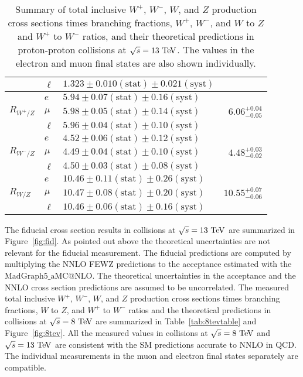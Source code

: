 \begin{table*}[tbhp]
\begin {tabular} {lllr}
  & $\ell$ & $1.323 \pm 0.010 \mathrm{(stat)}\pm 0.021 \mathrm{(syst)}$ & \\
\hline
             & $e$   & $5.94 \pm 0.07 \mathrm{(stat)}\pm 0.16 \mathrm{(syst)}$ &
             \\
$R_{W^{+}/Z}$   & $\mu$ & $5.98 \pm 0.05 \mathrm{(stat)}\pm 0.14 \mathrm{(syst)}$ & $6.06^{+0.04}_{-0.05}$ \\
             & $\ell$ & $5.96 \pm 0.04 \mathrm{(stat)}\pm 0.10 \mathrm{(syst)}$ &  \\
\hline
             & $e$   & $4.52 \pm 0.06 \mathrm{(stat)}\pm 0.12 \mathrm{(syst)}$ &
             \\
$R_{W^{-}/Z}$   & $\mu$ & $4.49 \pm 0.04 \mathrm{(stat)}\pm 0.10 \mathrm{(syst)}$ & $4.48^{+0.03}_{-0.02}$ \\
             & $\ell$ & $4.50 \pm 0.03 \mathrm{(stat)}\pm 0.08 \mathrm{(syst)}$ &  \\
\hline
             & $e$   & $10.46 \pm 0.11 \mathrm{(stat)}\pm 0.26 \mathrm{(syst)}$ &
             \\
$R_{W/Z}$   & $\mu$ & $10.47 \pm 0.08 \mathrm{(stat)}\pm 0.20 \mathrm{(syst)}$ & $10.55^{+0.07}_{-0.06}$ \\
             & $\ell$ & $10.46 \pm 0.06 \mathrm{(stat)}\pm 0.16 \mathrm{(syst)}$ &  \\
\hline
\end{tabular}
\caption{ \label{tab:results13}
Summary of total inclusive $W^{+}$, $W^{-}$, $W$, and $Z$ production cross sections times
branching fractions, $W^{+}$,  $W^{-}$, and $W$ to $Z$ and $W^{+}$ to $W^{-}$ ratios, and their
theoretical predictions in proton-proton collisions at $\sqrt{s}=13~\mathrm{Te\kern -0.1em V}$. The values in the electron and muon final states are also shown individually.}
\end{table*}
The fiducial cross section results in collisions at $\sqrt{s}=13~\mathrm{Te\kern -0.1em V}$ are summarized in Figure~\ref{fig:fid}. As pointed out above the theoretical uncertainties are not relevant for the fiducial measurement. The fiducial predictions are computed by multiplying the NNLO FEWZ predictions to the acceptance estimated with the $\mathrm{MadGraph5}\_\mathrm{aMC@NLO}$. The theoretical uncertainties in the acceptance and the NNLO cross section predictions are assumed to be uncorrelated. The measured total inclusive $W^+$, $W^-$, $W$, and $Z$ production cross sections times branching fractions, $W$ to $Z$, and $W^+$ to $W^-$ ratios and the theoretical predictions in collisions at $\sqrt{s}=8~\mathrm{Te\kern -0.1em V}$ are summarized in Table~\ref{tab:8tevtable} and Figure~\ref{fig:8tev}. All the measured values in collisions at $\sqrt{s}=8~\mathrm{Te\kern -0.1em V}$ and $\sqrt{s}=13~\mathrm{Te\kern -0.1em V}$ are consistent with the SM predictions accurate to NNLO in QCD. The individual measurements in the muon and electron final states separately are compatible. 
